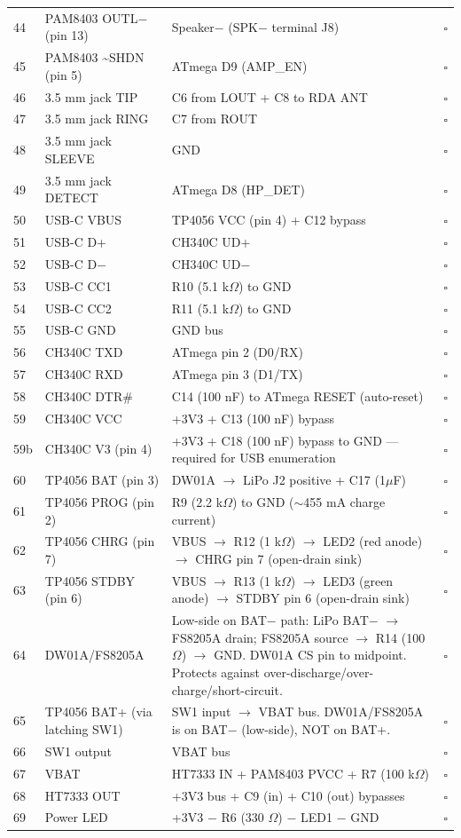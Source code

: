 \documentclass[a4paper,11pt]{article}
\renewcommand*{\,}{ }%
\begin{document}
\begin{longtable}{@{}p{0.5cm}p{5cm}p{5cm}p{1.5cm}@{}}
44 & PAM8403 OUTL$-$ (pin 13) & Speaker$-$ (SPK$-$ terminal J8) & $\square$ \\
45 & PAM8403 \textasciitilde{}SHDN (pin 5) & ATmega D9 (AMP\_EN) & $\square$ \\
46 & 3.5\,mm jack TIP & C6 from LOUT + C8 to RDA ANT & $\square$ \\
47 & 3.5\,mm jack RING & C7 from ROUT & $\square$ \\
48 & 3.5\,mm jack SLEEVE & GND & $\square$ \\
49 & 3.5\,mm jack DETECT & ATmega D8 (HP\_DET) & $\square$ \\
50 & USB-C VBUS & TP4056 VCC (pin 4) + C12 bypass & $\square$ \\
51 & USB-C D+ & CH340C UD+ & $\square$ \\
52 & USB-C D$-$ & CH340C UD$-$ & $\square$ \\
53 & USB-C CC1 & R10 (5.1\,k$\Omega$) to GND & $\square$ \\
54 & USB-C CC2 & R11 (5.1\,k$\Omega$) to GND & $\square$ \\
55 & USB-C GND & GND bus & $\square$ \\
56 & CH340C TXD & ATmega pin 2 (D0/RX) & $\square$ \\
57 & CH340C RXD & ATmega pin 3 (D1/TX) & $\square$ \\
58 & CH340C DTR\# & C14 (100\,nF) to ATmega RESET (auto-reset) & $\square$ \\
59 & CH340C VCC & +3V3 + C13 (100\,nF) bypass & $\square$ \\
59b & CH340C V3 (pin 4) & +3V3 + C18 (100\,nF) bypass to GND --- required for USB enumeration & $\square$ \\
60 & TP4056 BAT (pin 3) & DW01A $\to$ LiPo J2 positive + C17 (1$\mu$F) & $\square$ \\
61 & TP4056 PROG (pin 2) & R9 (2.2\,k$\Omega$) to GND ($\sim$455\,mA charge current) & $\square$ \\
62 & TP4056 CHRG (pin 7) & VBUS $\to$ R12 (1\,k$\Omega$) $\to$ LED2 (red anode) $\to$ CHRG pin 7 (open-drain sink) & $\square$ \\
63 & TP4056 STDBY (pin 6) & VBUS $\to$ R13 (1\,k$\Omega$) $\to$ LED3 (green anode) $\to$ STDBY pin 6 (open-drain sink) & $\square$ \\
64 & DW01A/FS8205A & Low-side on BAT$-$ path: LiPo BAT$-$ $\to$ FS8205A drain; FS8205A source $\to$ R14 (100$\Omega$) $\to$ GND. DW01A CS pin to midpoint. Protects against over-discharge/over-charge/short-circuit. & $\square$ \\
65 & TP4056 BAT+ (via latching SW1) & SW1 input $\to$ VBAT bus. DW01A/FS8205A is on BAT$-$ (low-side), NOT on BAT+. & $\square$ \\
66 & SW1 output & VBAT bus & $\square$ \\
67 & VBAT & HT7333 IN + PAM8403 PVCC + R7 (100\,k$\Omega$) & $\square$ \\
68 & HT7333 OUT & +3V3 bus + C9 (in) + C10 (out) bypasses & $\square$ \\
69 & Power LED & +3V3 $-$ R6 (330\,$\Omega$) $-$ LED1 $-$ GND & $\square$ \\
\bottomrule
\end{longtable}
\end{document}
